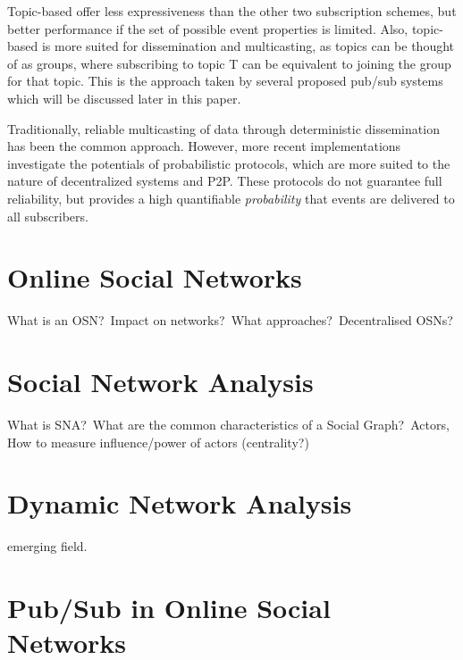 Topic-based offer less expressiveness than the other two subscription
schemes, but better performance if the set of possible event properties
is limited. Also, topic-based is more suited for dissemination and
multicasting, as topics can be thought of as groups, where subscribing
to topic T can be equivalent to joining the group for that topic. This
is the approach taken by several proposed pub/sub systems which will be
discussed later in this paper.

Traditionally, reliable multicasting of data through deterministic
dissemination has been the common approach. However, more recent
implementations investigate the potentials of probabilistic protocols,
which are more suited to the nature of decentralized systems and P2P.
These protocols do not guarantee full reliability, but provides a high
quantifiable \emph{probability} that events are delivered to all
subscribers.

\section{Online Social Networks}
What is an OSN?\ Impact on networks?\ What approaches?\ Decentralised OSNs?
\section{Social Network Analysis}
What is SNA?\ What are the common characteristics of a Social Graph?\
Actors, How to measure influence/power of actors (centrality?)
\section{Dynamic Network Analysis}
emerging field.
\section{Pub/Sub in Online Social Networks}

